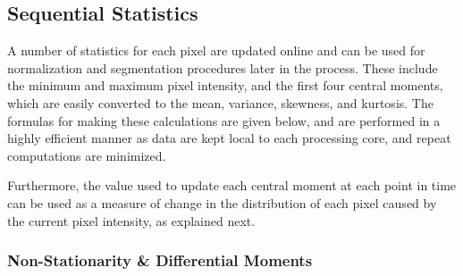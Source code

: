 \documentclass[../main.tex]{subfiles}
\begin{document}
\subsection{Sequential Statistics}\label{sec:sequential-statistics}

A number of statistics for each pixel are updated online and can be used for normalization and segmentation procedures later in the process.
These include the minimum and maximum pixel intensity, and the first four central moments, which are easily converted to the mean, variance, skewness, and kurtosis.
The formulas for making these calculations are given below, and are performed in a highly efficient manner as data are kept local to each processing core, and repeat computations are minimized.




Furthermore, the value used to update each central moment at each point in time can be used as a measure of change in the distribution of each pixel caused by the current pixel intensity, as explained next.

\subsubsection{Non-Stationarity \& Differential Moments}\label{sec:non-stationarity-differential-moments}
\end{document}
